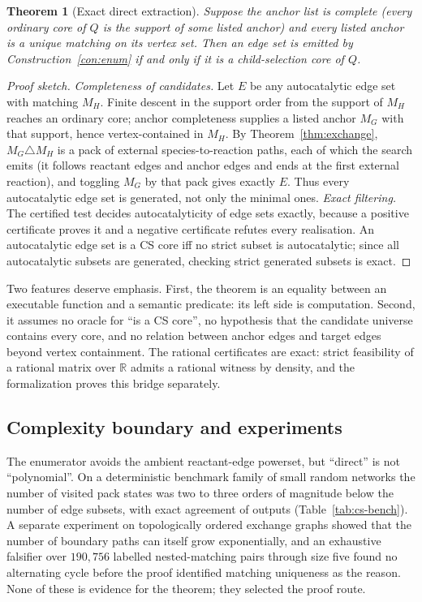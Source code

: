 \documentclass[11pt,a4paper]{article}
\theoremstyle{plain}
\newtheorem{theorem}{Theorem}[section]
\theoremstyle{definition}
\theoremstyle{remark}
\newcommand{\R}{\mathbb{R}}
\begin{document}
\begin{theorem}[Exact direct extraction]\label{thm:cs-exact}
Suppose the anchor list is complete (every ordinary core of $Q$ is the support of some listed anchor) and every listed anchor is a unique matching on its vertex set. Then an edge set is emitted by Construction~\ref{con:enum} if and only if it is a child-selection core of $Q$.
\end{theorem}

\begin{proof}[Proof sketch]
\emph{Completeness of candidates.} Let $E$ be any autocatalytic edge set with matching $M_H$. Finite descent in the support order from the support of $M_H$ reaches an ordinary core; anchor completeness supplies a listed anchor $M_G$ with that support, hence vertex-contained in $M_H$. By Theorem~\ref{thm:exchange}, $M_G\triangle M_H$ is a pack of external species-to-reaction paths, each of which the search emits (it follows reactant edges and anchor edges and ends at the first external reaction), and toggling $M_G$ by that pack gives exactly $E$. Thus every autocatalytic edge set is generated, not only the minimal ones. \emph{Exact filtering.} The certified test decides autocatalyticity of edge sets exactly, because a positive certificate proves it and a negative certificate refutes every realisation. An autocatalytic edge set is a CS core iff no strict subset is autocatalytic; since all autocatalytic subsets are generated, checking strict generated subsets is exact.
\end{proof}

Two features deserve emphasis. First, the theorem is an equality between an executable function and a semantic predicate: its left side is computation. Second, it assumes no oracle for ``is a CS core'', no hypothesis that the candidate universe contains every core, and no relation between anchor edges and target edges beyond vertex containment. The rational certificates are exact: strict feasibility of a rational matrix over $\R$ admits a rational witness by density, and the formalization proves this bridge separately.

\subsection{Complexity boundary and experiments}

The enumerator avoids the ambient reactant-edge powerset, but ``direct'' is not ``polynomial''. On a deterministic benchmark family of small random networks the number of visited pack states was two to three orders of magnitude below the number of edge subsets, with exact agreement of outputs (Table~\ref{tab:cs-bench}). A separate experiment on topologically ordered exchange graphs showed that the number of boundary paths can itself grow exponentially, and an exhaustive falsifier over $190{,}756$ labelled nested-matching pairs through size five found no alternating cycle before the proof identified matching uniqueness as the reason. None of these is evidence for the theorem; they selected the proof route.
\end{document}
